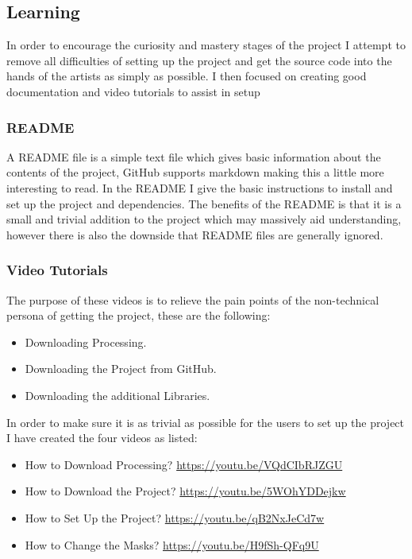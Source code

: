 \documentclass[a4paper]{report}
\begin{document}
\subsection{Learning}
In order to encourage the curiosity and mastery stages of the project I attempt to remove all difficulties of setting up the project and get the source code into the hands of the artists as simply as possible. I then focused on creating good documentation and video tutorials to assist in setup

\subsubsection{README}
A README file is a simple text file which gives basic information about the contents of the project, GitHub supports markdown making this a little more interesting to read. In the README I give the basic instructions to install and set up the project and dependencies. The benefits of the README is that it is a small and trivial addition to the project which may massively aid understanding, however there is also the downside that README files are generally ignored.

\subsubsection{Video Tutorials}
The purpose of these videos is to relieve the pain points of the non-technical persona of getting the project, these are the following:

\begin{itemize}
\item Downloading Processing.
\item Downloading the Project from GitHub.
\item Downloading the additional Libraries.
\end{itemize}

In order to make sure it is as trivial as possible for the users to set up the project I have created the four videos as listed:

\begin{itemize}
\item How to Download Processing? \url{https://youtu.be/VQdCIbRJZGU}
\item How to Download the Project? \url{https://youtu.be/5WOhYDDejkw}
\item How to Set Up the Project? \url{https://youtu.be/qB2NxJeCd7w}
\item How to Change the Masks? \url{https://youtu.be/H9fSh-QFq9U}
\end{itemize}
\end{document}
